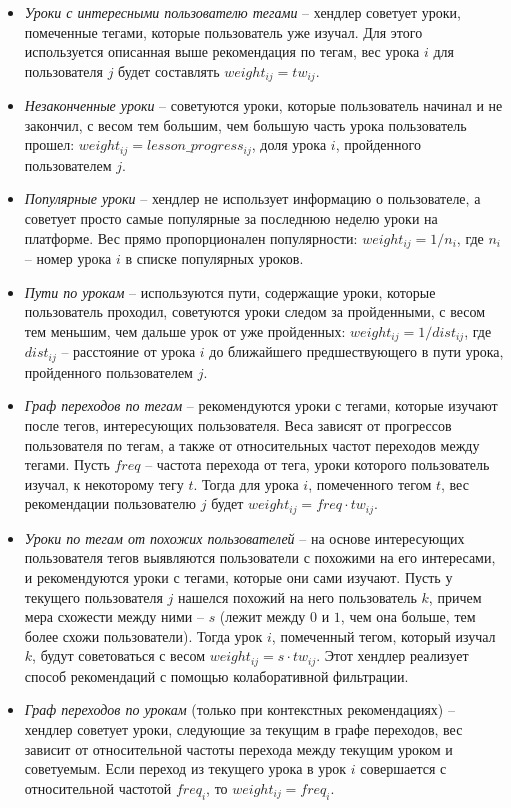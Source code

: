 \documentclass[14pt]{matmex-diploma}
\begin{document}
\begin{itemize}
    \item \textit{Уроки с интересными пользователю тегами} -- хендлер советует уроки, помеченные тегами, которые пользователь уже изучал. Для этого используется описанная выше рекомендация по тегам, вес урока $i$ для пользователя $j$ будет составлять $weight_{ij} = tw_{ij}$.
    \item \textit{Незаконченные уроки} -- советуются уроки, которые пользователь начинал и не закончил, с весом тем большим, чем большую часть урока пользователь прошел: $weight_{ij} = lesson\_progress_{ij}$, доля урока $i$, пройденного пользователем $j$. 
    \item \textit{Популярные уроки} -- хендлер не использует информацию о пользователе, а советует просто самые популярные за последнюю неделю уроки на платформе. Вес прямо пропорционален популярности: $weight_{ij} = 1 / n_i$, где $n_i$ -- номер урока $i$ в списке популярных уроков.
    \item \textit{Пути по урокам} -- используются пути, содержащие уроки, которые пользователь проходил, советуются уроки следом за пройденными, с весом тем меньшим, чем дальше урок от уже пройденных: $weight_{ij} = 1 / dist_{ij}$, где  $dist_{ij}$ -- расстояние от урока $i$ до ближайшего предшествующего в пути урока, пройденного пользователем $j$.
    \item \textit{Граф переходов по тегам} -- рекомендуются уроки с тегами, которые изучают после тегов, интересующих пользователя. Веса зависят от прогрессов пользователя по тегам, а также от относительных частот переходов между тегами. Пусть $freq$ -- частота перехода от тега, уроки которого пользователь изучал, к некоторому тегу $t$. Тогда для урока $i$, помеченного тегом $t$, вес рекомендации пользователю $j$ будет $weight_{ij} = freq \cdot tw_{ij}$. 
    \item \textit{Уроки по тегам от похожих пользователей} -- на основе интересующих пользователя тегов выявляются пользователи с похожими на его интересами, и рекомендуются уроки с тегами, которые они сами изучают. Пусть у текущего пользователя $j$ нашелся похожий на него пользователь $k$, причем мера схожести между ними -- $s$ (лежит между $0$ и $1$, чем она больше, тем более схожи пользователи). Тогда урок $i$, помеченный тегом, который изучал $k$, будут советоваться с весом $weight_{ij} = s \cdot tw_{ij}$. Этот хендлер реализует способ рекомендаций с помощью колаборативной фильтрации.
    \item \textit{Граф переходов по урокам} (только при контекстных рекомендациях) -- хендлер советует уроки, следующие за текущим в графе переходов, вес зависит от относительной частоты перехода между текущим уроком и советуемым. Если переход из текущего урока в урок $i$ совершается с относительной частотой $freq_i$, то  $weight_{ij} = freq_i$.

\end{itemize}
\end{document}
